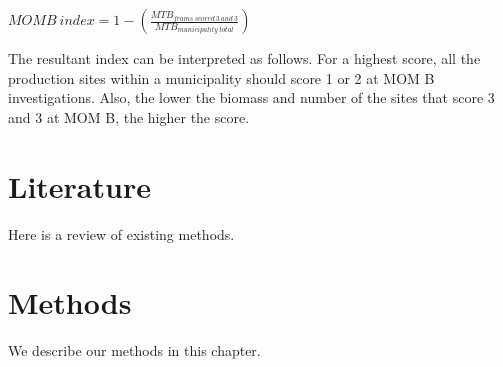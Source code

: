 \documentclass[
]{book}
\begin{document}
\(MOMB \ index = 1 - (\frac{MTB_{frams \ scored \ 3 \ and \ 3}}{MTB_{municipality \ total}})\)

The resultant index can be interpreted as follows. For a highest score, all the production sites within a municipality should score 1 or 2 at MOM B investigations. Also, the lower the biomass and number of the sites that score 3 and 3 at MOM B, the higher the score.

\hypertarget{literature}{%
\chapter{Literature}\label{literature}}

Here is a review of existing methods.

\hypertarget{methods}{%
\chapter{Methods}\label{methods}}

We describe our methods in this chapter.

  
\end{document}
